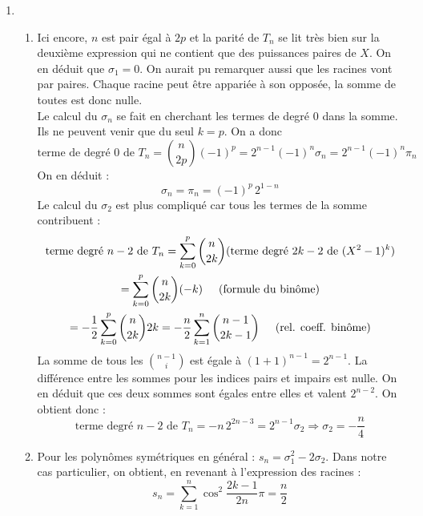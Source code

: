 \begin{enumerate}
\item \begin{enumerate}
 \item 
Ici encore, $n$ est pair égal à $2p$ et la parité de $T_n$ se lit très bien sur la deuxième expression qui ne contient que des puissances paires de $X$. On en déduit que $\sigma_1=0$. On aurait pu remarquer aussi que les racines vont par paires. Chaque racine peut être appariée à son opposée, la somme de toutes est donc nulle.\\
Le calcul du $\sigma_n$ se fait en cherchant les termes de degré $0$ dans la somme. Ils ne peuvent venir que du seul $k=p$. On a donc
\begin{displaymath}
 \text{terme de degré 0 de }T_n=\binom{n}{2p}(-1)^p=2^{n-1}(-1)^n\sigma_n=2^{n-1}(-1)^n\pi_n
\end{displaymath}
On en déduit :
\begin{displaymath}
 \sigma_n = \pi_n = (-1)^p\,2^{1-n}
\end{displaymath}
Le calcul du $\sigma_2$ est plus compliqué car tous les termes de la somme contribuent :
\begin{multline*}
 \text{terme degré $n-2$ de }T_n=\sum _{k=0}^{p}\binom{n}{2k}(\text{terme degré $2k-2$ de $(X^2-1)^k$})\\
= \sum _{k=0}^{p}\binom{n}{2k}(-k) \hspace{.5cm}\text{(formule du binôme)}\\
=-\frac{1}{2}\sum _{k=0}^{p}\binom{n}{2k}2k = -\frac{n}{2}\sum _{k=1}^{n}\binom{n-1}{2k-1} \hspace{.5cm}\text{(rel. coeff. binôme)}
\end{multline*}
La somme de tous les $\binom{n-1}{i}$ est égale à $(1+1)^{n-1}=2^{n-1}$. La différence entre les sommes pour les indices pairs et impairs est nulle. On en déduit que ces deux sommes sont égales entre elles et valent $2^{n-2}$. On obtient donc :
\begin{displaymath}
\text{terme degré $n-2$ de }T_n =-n\,2^{2n-3} = 2^{n-1}\sigma_2
\Rightarrow \sigma_2 = -\frac{n}{4}
\end{displaymath}
\item Pour les polynômes symétriques en général : $s_n = \sigma_1^2 - 2\sigma_2$. Dans notre cas particulier, on obtient, en revenant à l'expression des racines :
\begin{displaymath}
 s_n = \sum_{k=1}^n \cos^2\frac{2k-1}{2n}\pi = \frac{n}{2}
\end{displaymath}
\end{enumerate}
 

\end{enumerate}
